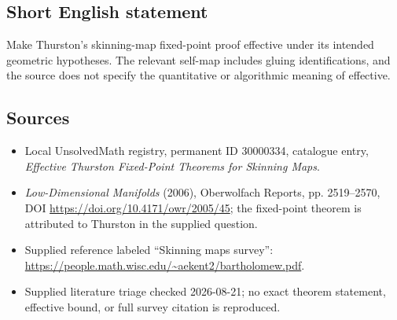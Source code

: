 \documentclass[11pt]{article}
\begin{document}
\subsection{Short English statement}
Make Thurston's skinning-map fixed-point proof effective under its intended geometric hypotheses. The relevant self-map includes gluing identifications, and the source does not specify the quantitative or algorithmic meaning of effective.
\subsection{Sources}
\begin{itemize}
\item Local UnsolvedMath registry, permanent ID 30000334, catalogue entry, \emph{Effective Thurston Fixed-Point Theorems for Skinning Maps}.
\item \emph{Low-Dimensional Manifolds} (2006), Oberwolfach Reports, pp. 2519--2570, DOI \url{https://doi.org/10.4171/owr/2005/45}; the fixed-point theorem is attributed to Thurston in the supplied question.
\item Supplied reference labeled ``Skinning maps survey'': \url{https://people.math.wisc.edu/~aekent2/bartholomew.pdf}.
\item Supplied literature triage checked 2026-08-21; no exact theorem statement, effective bound, or full survey citation is reproduced.
\end{itemize}
\end{document}
